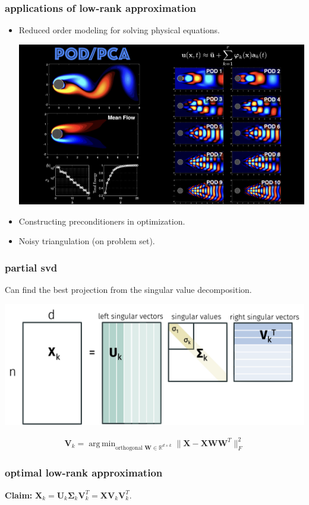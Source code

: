 \documentclass[compress]{beamer}
\newcommand{\bs}[1]{\boldsymbol{#1}}
\newcommand{\bv}[1]{\mathbf{#1}}
\newcommand{\R}{\mathbb{R}}
\DeclareMathOperator*{\argmin}{arg\,min}
\DeclareMathOperator*{\argmax}{arg\,max}
\begin{document}
\begin{frame}
	\frametitle{applications of low-rank approximation}
		\begin{itemize}
		\item Reduced order modeling for solving physical equations.
		\begin{center}
			\includegraphics[width=.6\textwidth]{diffeq.jpg}
		\end{center}
		\item Constructing preconditioners in optimization.
		\item Noisy triangulation (on problem set).
	\end{itemize}
\end{frame}

\begin{frame}[t]
	\frametitle{partial svd}
	Can find the best projection from the singular value decomposition.
	\begin{center}
		\includegraphics[width=.9\textwidth]{svdk.png}
	\end{center} 
	\begin{align*}
	\bv{V}_k = 	\argmin_{\text{orthogonal }\bv{W} \in \R^{d\times k}} \|\bv{X} - \bv{X}\bv{W}\bv{W}^T\|_F^2
	\end{align*}
\end{frame}

\begin{frame}[t]
	\frametitle{optimal low-rank approximation}
	\textbf{Claim:} $\bv{X}_k = \bv{U}_k\bs{\Sigma}_k\bv{V}_k^T =  \bv{X} \bv{V}_k\bv{V}_k^T$. 
\end{frame}
\end{document}
